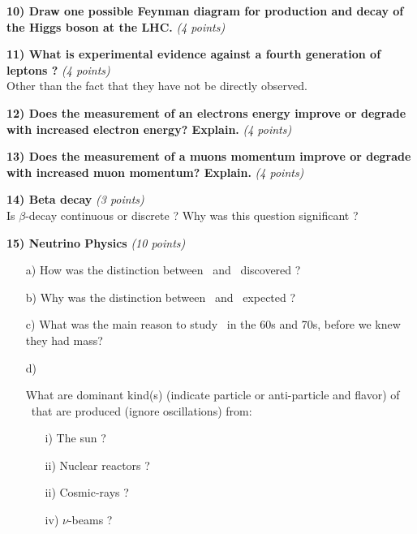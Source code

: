 {\clearpage

\textbf{10) Draw one possible Feynman diagram for production and decay of the Higgs boson at the LHC.} \hfill \textit{(4 points)}\\
\vspace{1.5in}

\textbf{11) What is experimental evidence against a fourth generation of leptons ? } \hfill \textit{(4 points)}\\
Other than the fact that they have not be directly observed.
\vspace{1.5in}

\textbf{12) Does the measurement of an electrons energy improve or degrade with increased electron energy? Explain.   } \hfill \textit{(4 points)}\\
\vspace*{1.5in}

\textbf{13) Does the measurement of a muons momentum improve or degrade with increased muon momentum? Explain.   } \hfill \textit{(4 points)}\\


\clearpage

\textbf{14) Beta decay } \hfill \textit{(3 points)}\\
Is $\beta$-decay continuous or discrete ? Why was this question significant ?
\vspace{1.0in}


\textbf{15) Neutrino Physics } \hfill \textit{(10 points)}\\
\begin{itemize}
\item[a)]{How was the distinction between \numu\ and \nue\ discovered ?
\vspace*{1.0in}
}

\item[b)]{Why was the distinction between \numu\ and \nue\  expected ?
\vspace*{1.0in}
}
\item[c)]{What was the main reason to study \nus\ in the 60s and 70s, before we knew they had mass?
\vspace*{0.5in}
}
\item[d)]{What are dominant kind(s) (indicate particle or anti-particle and flavor) of \nus\ that are produced (ignore oscillations) from:
\begin{itemize}
\item[i)]{ The sun ? 
\vspace*{0.25in}
} 
\item[ii)]{Nuclear reactors ? 
\vspace*{0.25in}
}
\item[ii)]{Cosmic-rays ? 
\vspace*{0.25in}
}
\item[iv)]{$\nu$-beams ?
\vspace*{0.25in}
}
\end{itemize}
}
\end{itemize}


}
